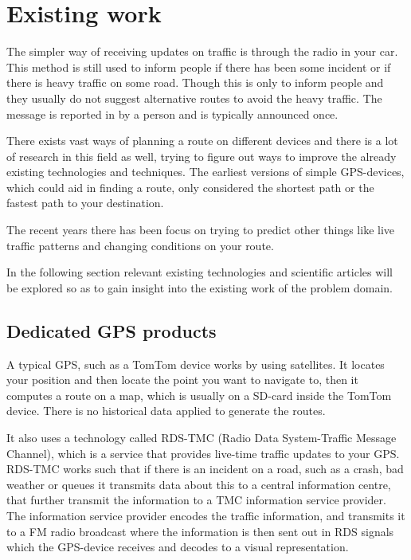 \section{Existing work}
The simpler way of receiving updates on traffic is through the radio in your car. This method is still used to inform people if there has been some incident or if there is heavy traffic on some road. Though this is only to inform people and they usually do not suggest alternative routes to avoid the heavy traffic. The message is reported in by a person and is typically announced once. 

There exists vast ways of planning a route on different devices and there is  a lot of research in this field as well, trying to figure out ways to improve the already existing technologies and techniques. The earliest versions of simple GPS-devices, which could aid in finding a route, only considered the shortest path or the fastest path to your destination.

The recent years there has been focus on trying to predict other things like live traffic patterns and changing conditions on your route.

In the following section relevant existing technologies and scientific articles will be explored so as to gain insight into the existing work of the problem domain.

\subsection*{Dedicated GPS products}
A typical GPS, such as a TomTom device works by using satellites. It locates your position and then locate the point you want to navigate to, then it computes a route on a map, which is usually on a SD-card inside the TomTom device. There is no historical data applied to generate the routes.

It also uses a technology called RDS-TMC (Radio Data System-Traffic Message Channel), which is a service that provides live-time traffic updates to your GPS. RDS-TMC works such that if there is an incident on a road, such as a crash, bad weather or queues it transmits data about this to a central information centre, that further transmit the information to a TMC information service provider. The information service provider encodes the traffic information, and transmits it to a FM radio broadcast where the information is then sent out in RDS signals which the GPS-device receives and decodes to a visual representation.

